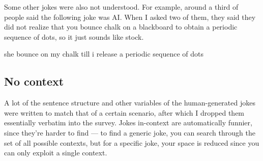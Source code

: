 \documentclass[11pt]{scrartcl}
\begin{document}
Some other jokes were also not understood. For example, around a third of people said the following joke was AI. When I asked two of them, they said they did not realize that you bounce chalk on a blackboard to obtain a periodic sequence of dots, so it just sounds like stock.
\begin{joke}
    she bounce on my chalk till i release a periodic sequence of dots
\end{joke}

\subsection{No context}

A lot of the sentence structure and other variables of the human-generated jokes were written to match that of a certain scenario, after which I dropped them essentially verbatim into the survey. Jokes in-context are automatically funnier, since they're harder to find --- to find a generic joke, you can search through the set of all possible contexts, but for a specific joke, your space is reduced since you can only exploit a single context.
\end{document}
